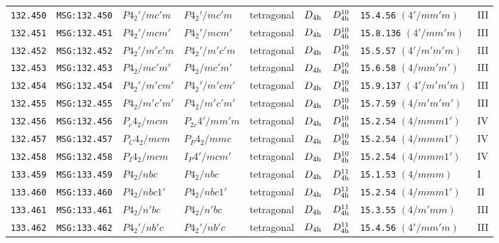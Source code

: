 \documentclass[fleqn,10pt]{jsarticle}
\begin{document}
\begin{center}
\begin{longtable}{lllllllll}
\texttt{132.450} & \texttt{MSG:132.450} & $P4_{2}'/mc'm$ & $P4_{2}'/mc'm$ & tetragonal & $D_{\rm 4h}$ & $D_{\rm 4h}^{10}$ & \texttt{15.4.56} $(4'/mm'm)$ & III \\
\texttt{132.451} & \texttt{MSG:132.451} & $P4_{2}'/mcm'$ & $P4_{2}'/mcm'$ & tetragonal & $D_{\rm 4h}$ & $D_{\rm 4h}^{10}$ & \texttt{15.8.136} $(4'/mm'm)$ & III \\
\texttt{132.452} & \texttt{MSG:132.452} & $P4_{2}'/m'c'm$ & $P4_{2}'/m'c'm$ & tetragonal & $D_{\rm 4h}$ & $D_{\rm 4h}^{10}$ & \texttt{15.5.57} $(4'/m'm'm)$ & III \\
\texttt{132.453} & \texttt{MSG:132.453} & $P4_{2}/mc'm'$ & $P4_{2}/mc'm'$ & tetragonal & $D_{\rm 4h}$ & $D_{\rm 4h}^{10}$ & \texttt{15.6.58} $(4/mm'm')$ & III \\
\texttt{132.454} & \texttt{MSG:132.454} & $P4_{2}'/m'cm'$ & $P4_{2}'/m'cm'$ & tetragonal & $D_{\rm 4h}$ & $D_{\rm 4h}^{10}$ & \texttt{15.9.137} $(4'/m'm'm)$ & III \\
\texttt{132.455} & \texttt{MSG:132.455} & $P4_{2}/m'c'm'$ & $P4_{2}/m'c'm'$ & tetragonal & $D_{\rm 4h}$ & $D_{\rm 4h}^{10}$ & \texttt{15.7.59} $(4/m'm'm')$ & III \\
\texttt{132.456} & \texttt{MSG:132.456} & $P_{c}4_{2}/mcm$ & $P_{2c}4'/mm'm$ & tetragonal & $D_{\rm 4h}$ & $D_{\rm 4h}^{10}$ & \texttt{15.2.54} $(4/mmm1')$ & IV \\
\texttt{132.457} & \texttt{MSG:132.457} & $P_{C}4_{2}/mcm$ & $P_{P}4_{2}/mmc$ & tetragonal & $D_{\rm 4h}$ & $D_{\rm 4h}^{10}$ & \texttt{15.2.54} $(4/mmm1')$ & IV \\
\texttt{132.458} & \texttt{MSG:132.458} & $P_{I}4_{2}/mcm$ & $I_{P}4'/mcm'$ & tetragonal & $D_{\rm 4h}$ & $D_{\rm 4h}^{10}$ & \texttt{15.2.54} $(4/mmm1')$ & IV \\ \hline
\texttt{133.459} & \texttt{MSG:133.459} & $P4_{2}/nbc$ & $P4_{2}/nbc$ & tetragonal & $D_{\rm 4h}$ & $D_{\rm 4h}^{11}$ & \texttt{15.1.53} $(4/mmm)$ & I \\
\texttt{133.460} & \texttt{MSG:133.460} & $P4_{2}/nbc1'$ & $P4_{2}/nbc1'$ & tetragonal & $D_{\rm 4h}$ & $D_{\rm 4h}^{11}$ & \texttt{15.2.54} $(4/mmm1')$ & II \\
\texttt{133.461} & \texttt{MSG:133.461} & $P4_{2}/n'bc$ & $P4_{2}/n'bc$ & tetragonal & $D_{\rm 4h}$ & $D_{\rm 4h}^{11}$ & \texttt{15.3.55} $(4/m'mm)$ & III \\
\texttt{133.462} & \texttt{MSG:133.462} & $P4_{2}'/nb'c$ & $P4_{2}'/nb'c$ & tetragonal & $D_{\rm 4h}$ & $D_{\rm 4h}^{11}$ & \texttt{15.4.56} $(4'/mm'm)$ & III \\

\end{longtable}
\end{center}
\end{document}
